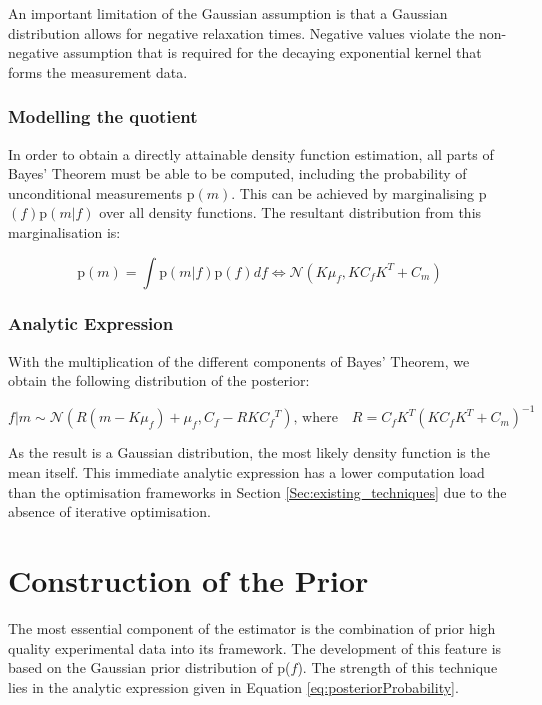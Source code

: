 An important limitation of the Gaussian assumption is that a Gaussian distribution allows for negative relaxation times. Negative values violate the non-negative assumption that is required for the decaying exponential kernel that forms the measurement data.


\subsubsection{Modelling the quotient}

In order to obtain a directly attainable density function estimation, all parts of Bayes’ Theorem must be able to be computed, including the probability of unconditional measurements p$(m)$. This can be achieved by marginalising p$(f)$p$(m|f)$ over all density functions. The resultant distribution from this marginalisation is:

\begin{equation}
    \label{eq:measurementProbability}
    \text{p}(m) = \int\text{p}(m|f)\text{p}(f) df \iff \mathcal{N}(K\mu_f, K C_f K^T + C_m)
\end{equation}


\subsubsection{Analytic Expression}
With the multiplication of the different components of Bayes’ Theorem, we obtain the following distribution of the posterior:

\begin{equation}
    \label{eq:posteriorProbability}
    f|m \sim \mathcal{N}(R(m-K\mu_f) + \mu_f, C_f - RKC{_f}^T)   \text{, where} \quad R = C_f K^T (KC_fK^T + C_m)^{-1}
\end{equation}

As the result is a Gaussian distribution, the most likely density function is the mean itself. This immediate analytic expression has a lower computation load than the optimisation frameworks in Section \ref{Sec:existing_techniques} due to the absence of iterative optimisation.




\section{Construction of the Prior}
\label{section:makingPrior}
The most essential component of the estimator is the combination of prior high quality experimental data into its framework. The development of this feature is based on the Gaussian prior distribution of p($f$).  The strength of this technique lies in the analytic expression given in Equation \ref{eq:posteriorProbability}.

